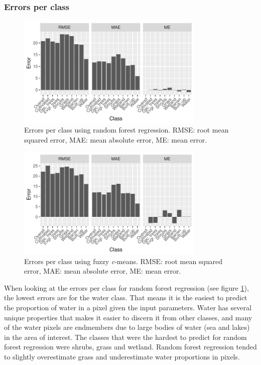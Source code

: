 \documentclass[a4paper,12pt]{scrbook}
\begin{document}
\subsubsection{Errors per class}

\begin{figure}
  \centering
  \includegraphics[width=0.8\textwidth]{thesis-figures/perclass-errors-rf}
  \caption{Errors per class using random forest regression. RMSE: root mean squared error, MAE: mean absolute error, ME: mean error.}
  \label{fig-perclass-errors-rf}
\end{figure}

\begin{figure}
  \centering
  \includegraphics[width=0.8\textwidth]{thesis-figures/perclass-errors-cm}
  \caption{Errors per class using fuzzy \textit{c}-means. RMSE: root mean squared error, MAE: mean absolute error, ME: mean error.}
  \label{fig-perclass-errors-cm}
\end{figure}

When looking at the errors per class for random forest regression (see figure \ref{fig-perclass-errors-rf}), the lowest errors are for the water class. That means it is the easiest to predict the proportion of water in a pixel given the input parameters. Water has several unique properties that makes it easier to discern it from other classes, and many of the water pixels are endmembers due to large bodies of water (sea and lakes) in the area of interest. The classes that were the hardest to predict for random forest regression were shrubs, grass and wetland. Random forest regression tended to slightly overestimate grass and underestimate water proportions in pixels.
\end{document}
